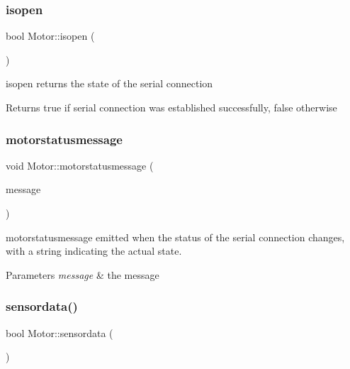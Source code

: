 \subsubsection{\texorpdfstring{isopen}{isopen}}
{\footnotesize\ttfamily bool Motor\+::isopen (\begin{DoxyParamCaption}{ }\end{DoxyParamCaption})\hspace{0.3cm}{\ttfamily [slot]}}



isopen returns the state of the serial connection 

\begin{DoxyReturn}{Returns}
true if serial connection was established successfully, false otherwise 
\end{DoxyReturn}
\mbox{\label{classMotor_ad12a639c95a4a33f59118dc8145dc1d4}} 
\subsubsection{\texorpdfstring{motorstatusmessage}{motorstatusmessage}}
{\footnotesize\ttfamily void Motor\+::motorstatusmessage (\begin{DoxyParamCaption}\item[{const Q\+String \&}]{message }\end{DoxyParamCaption})\hspace{0.3cm}{\ttfamily [signal]}}



motorstatusmessage emitted when the status of the serial connection changes, with a string indicating the actual state. 


\begin{DoxyParams}{Parameters}
{\em message} & the message \\
\hline
\end{DoxyParams}
\mbox{\label{classMotor_a3e5e0ed8b8095588a09283200aaeb142}} 
\subsubsection{\texorpdfstring{sensordata()}{sensordata()}}
{\footnotesize\ttfamily bool Motor\+::sensordata (\begin{DoxyParamCaption}{ }\end{DoxyParamCaption})}



